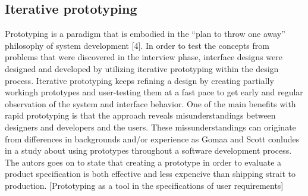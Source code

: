 \subsection{Iterative prototyping}
Prototyping is a paradigm that is embodied in the “plan to throw one
away” philosophy of system development [4].
In order to test the concepts from problems that were discovered in the interview phase, interface designs were designed and developed by utilizing iterative prototyping within the design process. Iterative prototyping keeps refining a design by creating partially workingh prototypes and user-testing them at a fast pace to get early and regular observation of the system and interface behavior. One of the main benefits with rapid prototyping is that the approach reveals misunderstandings between
designers and developers and the  users. These missunderstandings can originate from
 differences in backgrounds and/or experience as Gomaa and Scott conludes in a study about using prototypes throughout a software development process. The autors goes on to state that creating a prototype in order to evaluate a product specification is both effective and less expencive than shipping strait to production.
[Prototyping as
a tool in the specifications of user requirements]
